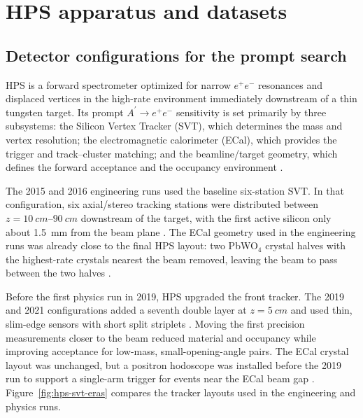 \section{HPS apparatus and datasets}
\label{sec:datasets}

\subsection{Detector configurations for the prompt search}

HPS is a forward spectrometer optimized for narrow $e^+e^-$ resonances and displaced
vertices in the high-rate environment immediately downstream of a thin tungsten target.
Its prompt $A^\prime \rightarrow e^+e^-$ sensitivity is set primarily by three
subsystems: the Silicon Vertex Tracker (SVT), which determines the mass and vertex
resolution; the electromagnetic calorimeter (ECal), which provides the trigger and
track--cluster matching; and the beamline/target geometry, which defines the forward
acceptance and the occupancy environment \cite{HPSExperiment2022,HPS2016PromptLong}.

The 2015 and 2016 engineering runs used the baseline six-station SVT. In that
configuration, six axial/stereo tracking stations were distributed between
$z=\SIrange{10}{90}{cm}$ downstream of the target, with the first active silicon only
about \SI{1.5}{mm} from the beam plane \cite{HPS2016BumpInternal,HPSExperiment2022}.
The ECal geometry used in the engineering runs was already close to the final HPS
layout: two PbWO$_4$ crystal halves with the highest-rate crystals nearest the beam
removed, leaving the beam to pass between the two halves
\cite{HPS2016BumpInternal,HPSExperiment2022}.

Before the first physics run in 2019, HPS upgraded the front tracker. The 2019 and
2021 configurations added a seventh double layer at $z=\SI{5}{cm}$ and used thin,
slim-edge sensors with short split striplets
\cite{HPSExperiment2022,HPSSlimEdgeSensors2020}. Moving the first precision
measurements closer to the beam reduced material and occupancy while improving
acceptance for low-mass, small-opening-angle pairs. The ECal crystal layout was
unchanged, but a positron hodoscope was installed before the 2019 run to support a
single-arm trigger for events near the ECal beam gap \cite{HPSExperiment2022}.
Figure~\ref{fig:hps-svt-eras} compares the tracker layouts used in the engineering and
physics runs.

